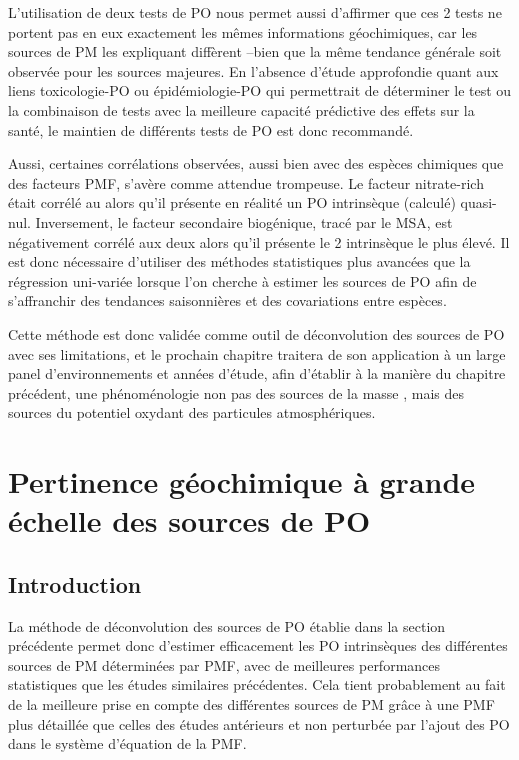 L'utilisation de deux tests de PO nous permet aussi d'affirmer que ces 2 tests ne portent
pas en eux exactement les mêmes informations géochimiques, car les sources de PM les
expliquant diffèrent --bien que la même tendance générale soit observée pour les sources majeures. En l'absence
d'étude approfondie quant aux liens toxicologie-PO ou épidémiologie-PO qui permettrait de déterminer le test ou la combinaison de tests avec la meilleure capacité prédictive des effets sur la santé, le maintien de
différents tests de PO est donc recommandé.

Aussi, certaines corrélations observées, aussi bien avec des espèces chimiques que des
facteurs PMF, s'avère comme attendue trompeuse. Le facteur nitrate-rich était corrélé au
\POAAv{} alors qu'il présente en réalité un PO intrinsèque (calculé) quasi-nul. Inversement, le facteur
secondaire biogénique, tracé par le MSA, est négativement corrélé aux deux \OPv{} alors
qu'il présente le 2\ieme{} \PODTT{} intrinsèque le plus élevé. Il est donc nécessaire
d'utiliser des méthodes statistiques plus avancées que la régression uni-variée lorsque
l'on cherche à estimer les sources de PO afin de s'affranchir des tendances saisonnières et
des covariations entre espèces.

Cette méthode est donc validée comme outil de déconvolution des sources de PO avec ses limitations, et le
prochain chapitre traitera de son application à un large panel d'environnements et années
d'étude, afin d'établir à la manière du chapitre précédent, une phénoménologie non pas des
sources de la masse \PMdix, mais des sources du potentiel oxydant des particules atmosphériques.


\section{Pertinence géochimique à grande échelle des sources de PO}%
\label{sec:synthèse_grande_échelle}

\subsection{Introduction}%
\label{sub:introduction_synthèse_nationale}

La méthode de déconvolution des sources de PO établie dans la section précédente permet donc
d'estimer efficacement les PO intrinsèques des différentes sources de PM déterminées par
PMF, avec de meilleures performances statistiques que les études similaires précédentes.
Cela tient probablement au fait de la meilleure prise en compte des différentes sources de
PM grâce à une PMF plus détaillée que celles des études antérieurs et non
perturbée par l'ajout des PO dans le système d'équation de la PMF.

